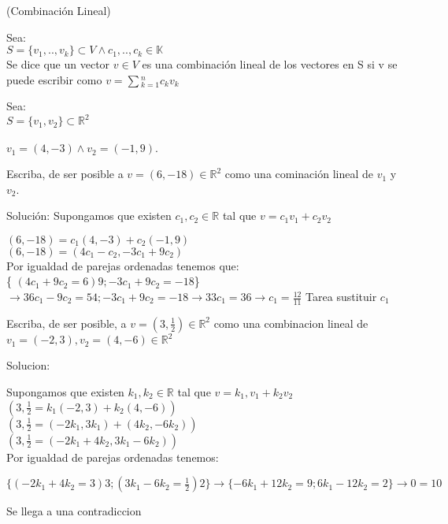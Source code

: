 \newpage
\begin{defin} (Combinaci\'{o}n Lineal)

    Sea:\\ $ S =\{v_1,.., v_k\} %
    \subset V  \land c_1,..,c_k \in \mathbb{K}$\\ Se dice que un vector $v \in V  $ es una combinaci\'{o}n lineal de los vectores en S si v se puede escribir como  $v =\sum{_{k=1}^nc_kv_k }$
\end{defin}



\begin{ejem}
    Sea:\\ $S=\{v_1,v_2\} \subset \mathbb{R}^2$\\  \\$v_1 =(4,-3) \land v_2 = (-1,9).   $

    Escriba, de ser posible a $v=(6,-18)\in \mathbb{R}^2$ como una cominaci\'{o}n lineal de $v_1$ y $v_2$.

    Soluci\'{o}n:
    Supongamos que existen $c_1,c_2 \in \mathbb{R}$ tal que $v = c_1v_1 + c_2v_2$


    $ (6,-18) = c_1(4,-3)+c_2(-1,9) $ \\$ (6,-18) = (4c_1-c_2,-3c_1+9c_2) $ \\ Por igualdad de parejas ordenadas tenemos que: \\

    \{ $(4c_1 + 9c_2 = 6)9; -3c_1 + 9c_2=-18$\} $\to 36c_1-9c_2 = 54 ; -3c_1 + 9c_2 = -18 \to 33c_1 =36 \to c_1 = \frac{12}{11}  $ Tarea sustituir $c_1$
\end{ejem}

    \begin{ejem}

     Escriba, de ser posible, a $v=(3,\frac{1}{2})\in \mathbb{R}^2$ como una combinacion lineal de $v_1=(-2,3),v_2=(4,-6) \in \mathbb{R}^2$

    Solucion:

    Supongamos que existen $k_1,k_2 \in \mathbb{R}$ tal que $v= k_1,v_1 + k_2v_2$
    \\
    $(3,\frac{1}{2}=k_1(-2,3)+k_2(4,-6))$ \\
     $(3,\frac{1}{2}=(-2k_1,3k_1)+(4k_2,-6k_2))$ \\
      $(3,\frac{1}{2}=(-2k_1 + 4k_2,3k_1 -6k_2))$ \\

      Por igualdad de parejas ordenadas tenemos:

      $\{(-2k_1 + 4k_2=3)3; (3k_1 -6k_2 = \frac{1}{2})2\} \to \{-6k_1+12k_2=9;6k_1-12k_2=2\}\to 0=10 $

      Se llega a una contradiccion
\end{ejem}


